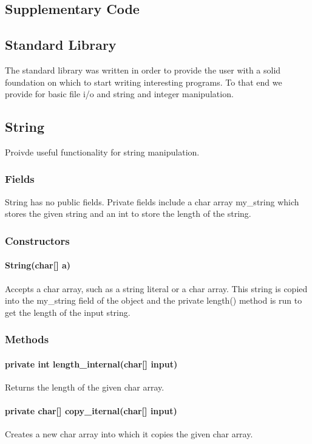 \begin{homeworkProblem}
    \chapter{Supplementary Code}
	\section{Standard Library}
    The standard library was written in order to provide the user with a solid foundation on which to start writing interesting programs. To that end we provide for basic file i/o and string and integer manipulation.
	
	\section{String}
    Proivde useful functionality for string manipulation.

	\subsection{Fields}
	String has no public fields. Private fields include a char array my_string which stores the given string and an int to store the length of the string. 

	\subsection{Constructors}
	\subsubsection{String(char[] a)}
    Accepts a char array, such as a string literal or a char array. This string is copied into the my_string field of the object and the private length() method is run to get the length of the input string.

	\subsection{Methods}
    \subsubsection{private int length_internal(char[] input)}
    Returns the length of the given char array.
    \subsubsection{private char[] copy_iternal(char[] input)}
    Creates a new char array into which it copies the given char array.

\end{homeworkProblem}
